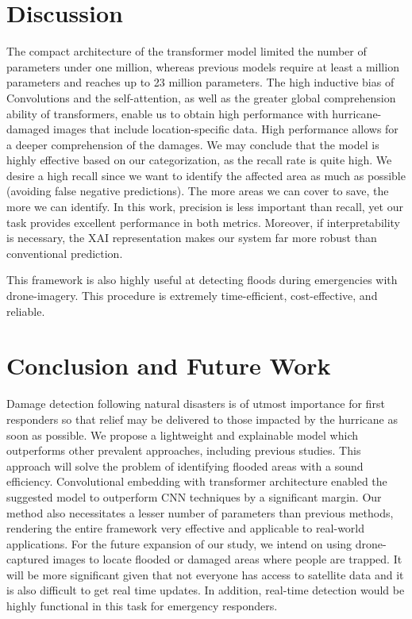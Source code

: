 \documentclass[conference]{IEEEtran}
\begin{document}
\section{Discussion}
\label{discussion}
The compact architecture of the transformer model limited the number of parameters under one million, whereas previous models require at least a million parameters and reaches up to 23 million parameters. The high inductive bias of Convolutions and the self-attention, as well as the greater global comprehension ability of transformers, enable us to obtain high performance with hurricane-damaged images that include location-specific data. High performance allows for a deeper comprehension of the damages.
We may conclude that the model is highly effective based on our categorization, as the recall rate is quite high. We desire a high recall since we want to identify the affected area as much as possible (avoiding false negative predictions). The more areas we can cover to save, the more we can identify. In this work, precision is less important than recall, yet our task provides excellent performance in both metrics. Moreover, if interpretability is necessary, the XAI representation makes our system far more robust than conventional prediction.

This framework is also highly useful at detecting floods during emergencies with drone-imagery. This procedure is extremely time-efficient, cost-effective, and reliable.


\section{Conclusion and Future Work}
\label{conclution}
Damage detection following natural disasters is of utmost importance for first responders so that relief may be delivered to those impacted by the hurricane as soon as possible. We propose a lightweight and explainable model which outperforms other prevalent approaches, including previous studies. This approach will solve the problem of identifying flooded areas with a sound efficiency. Convolutional embedding with transformer architecture enabled the suggested model to outperform CNN techniques by a significant margin. Our method also necessitates a lesser number of parameters than previous methods, rendering the entire framework very effective and applicable to real-world applications. For the future expansion of our study, we intend on using drone-captured images to locate flooded or damaged areas where people are trapped. It will be more significant given that not everyone has access to satellite data and it is also difficult to get real time updates. In addition, real-time detection would be highly functional in this task for emergency responders.




\vspace{12pt}
\color{red}
\end{document}
